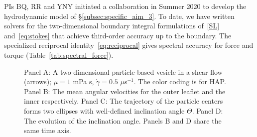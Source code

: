 PIs BQ, RR and YNY initiated a collaboration in Summer 2020 to
develop the hydrodynamic model of \S\ref{subsec:specific_aim_3}.  To
date, we have written solvers for the two-dimensional boundary integral
formulations of~\eqref{SL} and~\eqref{eq:stokes} that achieve
third-order accuracy up to the boundary. The specialized reciprocal
identity~\eqref{eq:reciprocal} gives spectral accuracy for force and
torque (Table~\ref{tab:spectral_force}).
\begin{figure}
  \vspace{-25pt}
  \caption{\label{fig:tank_treading} \footnotesize
    Panel A: A two-dimensional
    particle-based vesicle in a shear flow (arrows); $\mu  = 1$ mPa s,
    $\dot{\gamma} = 0.5$ $\mu$s$^{-1}$. The color coding is for HAP. Panel B: The
    mean angular velocities for the outer leaflet and the inner
    respectively.  Panel C: The trajectory of the particle
    centers forms two ellipses with well-defined inclination angle
    $\Theta$. Panel D: The evolution of the inclination angle.
    Panels B and D share the same time axis.}
\end{figure}

